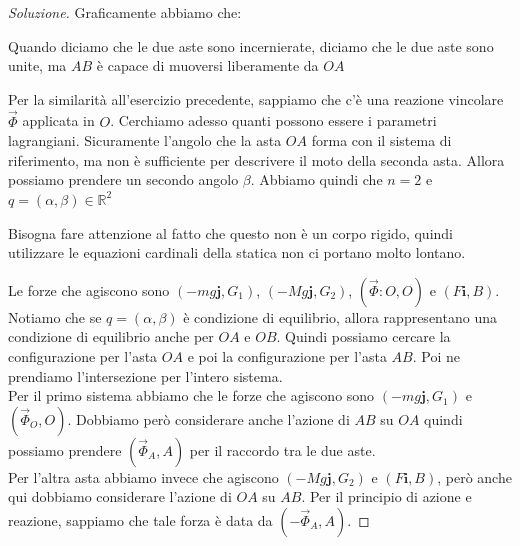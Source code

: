 \documentclass[11pt,a4paper,twoside]{article}
\theoremstyle{definition}
\newenvironment{sol}
	{\renewcommand\qedsymbol{$\blacksquare$}\begin{proof}[Soluzione]}
	{\end{proof}}
\begin{document}
\begin{sol}
	Graficamente abbiamo che:
	\begin{center}
	\end{center}
	Quando diciamo che le due aste sono incernierate, diciamo che le due aste sono unite, ma $AB$ è capace di muoversi liberamente da $OA$

	Per la similarità all'esercizio precedente, sappiamo che c'è una reazione vincolare $\vec \Phi$ applicata in $O$. Cerchiamo adesso quanti possono essere i parametri lagrangiani. Sicuramente l'angolo che la asta $OA$ forma con il sistema di riferimento, ma non è sufficiente per descrivere il moto della seconda asta. Allora possiamo prendere un secondo angolo $\beta$. Abbiamo quindi che $n = 2$ e $q = (\alpha, \beta) \in \mathbb R^2$

	Bisogna fare attenzione al fatto che questo non è un corpo rigido, quindi utilizzare le equazioni cardinali della statica non ci portano molto lontano.

	Le forze che agiscono sono $(-mg\mathbf j, G_1)$, $(-Mg\mathbf j, G_2)$, $(\vec \Phi:O,O)$ e $(F \mathbf i, B)$. Notiamo che se $q = (\alpha,\beta)$ è condizione di equilibrio, allora rappresentano una condizione di equilibrio anche per $OA$ e $OB$. Quindi possiamo cercare la configurazione per l'asta $OA$ e poi la configurazione per l'asta $AB$. Poi ne prendiamo l'intersezione per l'intero sistema.\\
	Per il primo sistema abbiamo che le forze che agiscono sono $(-mg\mathbf j, G_1)$ e $(\vec \Phi_O,O)$. Dobbiamo però considerare anche l'azione di $AB$ su $OA$ quindi possiamo prendere $(\vec \Phi_A, A)$ per il raccordo tra le due aste.\\
	Per l'altra asta abbiamo invece che agiscono $(-Mg\mathbf j, G_2)$ e $(F\mathbf i, B)$, però anche qui dobbiamo considerare l'azione di $OA$ su $AB$. Per il principio di azione e reazione, sappiamo che tale forza è data da $(-\vec \Phi_A, A)$.


\end{sol}
\end{document}
